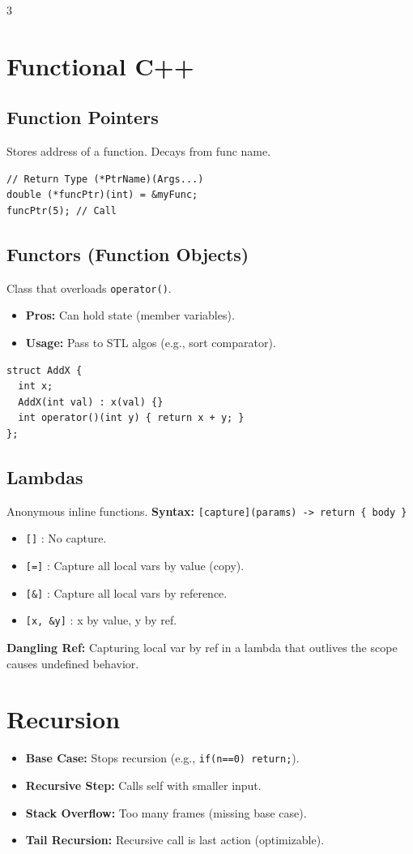 \documentclass[10pt, landscape, a4paper]{article}
\begin{document}
\begin{multicols*}{3}
  \section{Functional C++}
  \subsection{Function Pointers}
  Stores address of a function. Decays from func name.
\begin{verbatim}
// Return Type (*PtrName)(Args...)
double (*funcPtr)(int) = &myFunc;
funcPtr(5); // Call
\end{verbatim}

  \subsection{Functors (Function Objects)}
  Class that overloads \texttt{operator()}.
  \begin{itemize}
    \item \textbf{Pros:} Can hold state (member variables).
    \item \textbf{Usage:} Pass to STL algos (e.g., sort comparator).
  \end{itemize}
\begin{verbatim}
struct AddX {
  int x;
  AddX(int val) : x(val) {}
  int operator()(int y) { return x + y; }
};
\end{verbatim}

  \subsection{Lambdas}
  Anonymous inline functions.
  \textbf{Syntax:} \texttt{[capture](params) -> return \{ body \}}
  \begin{itemize}
    \item \texttt{[]} : No capture.
    \item \texttt{[=]} : Capture all local vars by value (copy).
    \item \texttt{[\&]} : Capture all local vars by reference.
    \item \texttt{[x, \&y]} : x by value, y by ref.
  \end{itemize}
  \textbf{Dangling Ref:} Capturing local var by ref in a lambda that
  outlives the scope causes undefined behavior.

  \section{Recursion}
  \begin{itemize}
    \item \textbf{Base Case:} Stops recursion (e.g., \texttt{if(n==0) return;}).
    \item \textbf{Recursive Step:} Calls self with smaller input.
    \item \textbf{Stack Overflow:} Too many frames (missing base case).
    \item \textbf{Tail Recursion:} Recursive call is last action (optimizable).
  \end{itemize}


\end{multicols*}
\end{document}
